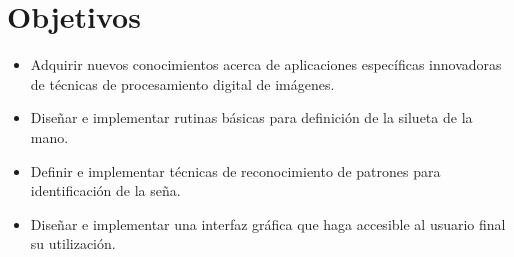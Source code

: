 \section*{Objetivos}

\begin{itemize}
\item Adquirir nuevos conocimientos acerca de aplicaciones específicas innovadoras
de técnicas de procesamiento digital de imágenes.

\bigskip
	\item Diseñar e implementar rutinas básicas para definición de la silueta de la mano.
	\item Definir e implementar técnicas de reconocimiento de patrones para identificación de la seña.
	\item Diseñar e implementar una interfaz gráfica que haga accesible al usuario final su utilización.
\end{itemize}

